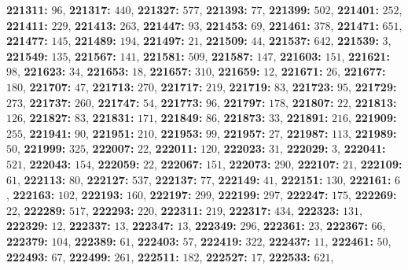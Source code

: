 \textsf{\bfseries 221311:} $96$, \textsf{\bfseries 221317:} $440$, \textsf{\bfseries 221327:} $577$, \textsf{\bfseries 221393:} $77$, \textsf{\bfseries 221399:} $502$, \textsf{\bfseries 221401:} $252$, \textsf{\bfseries 221411:} $229$, \textsf{\bfseries 221413:} $263$, \textsf{\bfseries 221447:} $93$, \textsf{\bfseries 221453:} $69$, \textsf{\bfseries 221461:} $378$, \textsf{\bfseries 221471:} $651$, \textsf{\bfseries 221477:} $145$, \textsf{\bfseries 221489:} $194$, \textsf{\bfseries 221497:} $21$, \textsf{\bfseries 221509:} $44$, \textsf{\bfseries 221537:} $642$, \textsf{\bfseries 221539:} $3$, \textsf{\bfseries 221549:} $135$, \textsf{\bfseries 221567:} $141$, \textsf{\bfseries 221581:} $509$, \textsf{\bfseries 221587:} $147$, \textsf{\bfseries 221603:} $151$, \textsf{\bfseries 221621:} $98$, \textsf{\bfseries 221623:} $34$, \textsf{\bfseries 221653:} $18$, \textsf{\bfseries 221657:} $310$, \textsf{\bfseries 221659:} $12$, \textsf{\bfseries 221671:} $26$, \textsf{\bfseries 221677:} $180$, \textsf{\bfseries 221707:} $47$, \textsf{\bfseries 221713:} $270$, \textsf{\bfseries 221717:} $219$, \textsf{\bfseries 221719:} $83$, \textsf{\bfseries 221723:} $95$, \textsf{\bfseries 221729:} $273$, \textsf{\bfseries 221737:} $260$, \textsf{\bfseries 221747:} $54$, \textsf{\bfseries 221773:} $96$, \textsf{\bfseries 221797:} $178$, \textsf{\bfseries 221807:} $22$, \textsf{\bfseries 221813:} $126$, \textsf{\bfseries 221827:} $83$, \textsf{\bfseries 221831:} $171$, \textsf{\bfseries 221849:} $86$, \textsf{\bfseries 221873:} $33$, \textsf{\bfseries 221891:} $216$, \textsf{\bfseries 221909:} $255$, \textsf{\bfseries 221941:} $90$, \textsf{\bfseries 221951:} $210$, \textsf{\bfseries 221953:} $99$, \textsf{\bfseries 221957:} $27$, \textsf{\bfseries 221987:} $113$, \textsf{\bfseries 221989:} $50$, \textsf{\bfseries 221999:} $325$, \textsf{\bfseries 222007:} $22$, \textsf{\bfseries 222011:} $120$, \textsf{\bfseries 222023:} $31$, \textsf{\bfseries 222029:} $3$, \textsf{\bfseries 222041:} $521$, \textsf{\bfseries 222043:} $154$, \textsf{\bfseries 222059:} $22$, \textsf{\bfseries 222067:} $151$, \textsf{\bfseries 222073:} $290$, \textsf{\bfseries 222107:} $21$, \textsf{\bfseries 222109:} $61$, \textsf{\bfseries 222113:} $80$, \textsf{\bfseries 222127:} $537$, \textsf{\bfseries 222137:} $77$, \textsf{\bfseries 222149:} $41$, \textsf{\bfseries 222151:} $130$, \textsf{\bfseries 222161:} $6$, \textsf{\bfseries 222163:} $102$, \textsf{\bfseries 222193:} $160$, \textsf{\bfseries 222197:} $299$, \textsf{\bfseries 222199:} $297$, \textsf{\bfseries 222247:} $175$, \textsf{\bfseries 222269:} $22$, \textsf{\bfseries 222289:} $517$, \textsf{\bfseries 222293:} $220$, \textsf{\bfseries 222311:} $219$, \textsf{\bfseries 222317:} $434$, \textsf{\bfseries 222323:} $131$, \textsf{\bfseries 222329:} $12$, \textsf{\bfseries 222337:} $13$, \textsf{\bfseries 222347:} $13$, \textsf{\bfseries 222349:} $296$, \textsf{\bfseries 222361:} $23$, \textsf{\bfseries 222367:} $66$, \textsf{\bfseries 222379:} $104$, \textsf{\bfseries 222389:} $61$, \textsf{\bfseries 222403:} $57$, \textsf{\bfseries 222419:} $322$, \textsf{\bfseries 222437:} $11$, \textsf{\bfseries 222461:} $50$, \textsf{\bfseries 222493:} $67$, \textsf{\bfseries 222499:} $261$, \textsf{\bfseries 222511:} $182$, \textsf{\bfseries 222527:} $17$, \textsf{\bfseries 222533:} $621$, 
